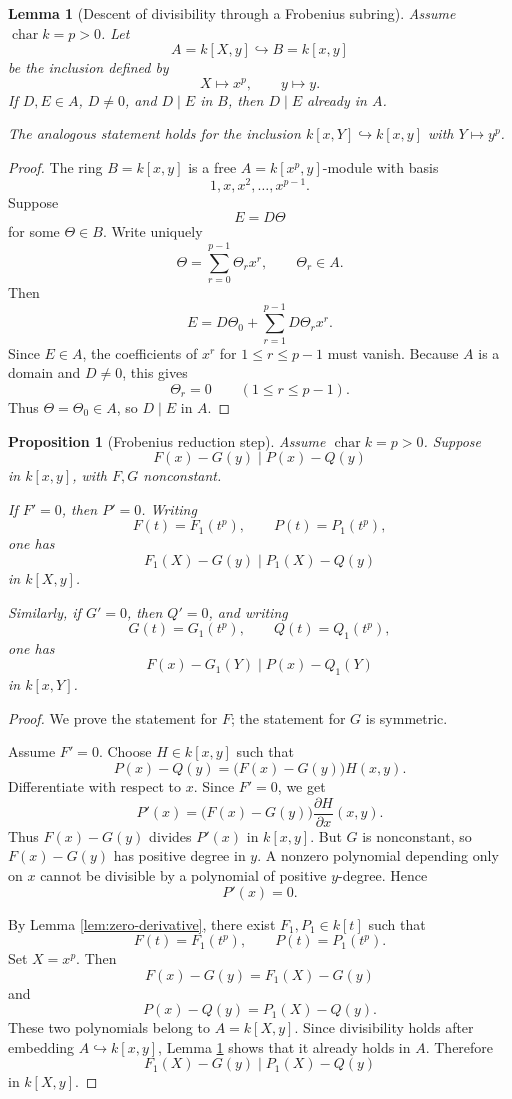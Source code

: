 \documentclass[12pt]{article}
\newtheorem{proposition}[theorem]{Proposition}
\newtheorem{lemma}[theorem]{Lemma}
\begin{document}
\begin{lemma}[Descent of divisibility through a Frobenius subring]\label{lem:frob-descent}
Assume \(\operatorname{char} k=p>0\).  Let
\[
    A=k[X,y]
    \hookrightarrow
    B=k[x,y]
\]
be the inclusion defined by
\[
    X\longmapsto x^p,
    \qquad
    y\longmapsto y.
\]
If \(D,E\in A\), \(D\neq 0\), and \(D\mid E\) in \(B\), then \(D\mid E\) already in \(A\).

The analogous statement holds for the inclusion \(k[x,Y]\hookrightarrow k[x,y]\) with \(Y\mapsto y^p\).
\end{lemma}

\begin{proof}
The ring \(B=k[x,y]\) is a free \(A=k[x^p,y]\)-module with basis
\[
    1,x,x^2,\ldots,x^{p-1}.
\]
Suppose
\[
    E=D\Theta
\]
for some \(\Theta\in B\).  Write uniquely
\[
    \Theta=\sum_{r=0}^{p-1}\Theta_r x^r,
    \qquad
    \Theta_r\in A.
\]
Then
\[
    E=D\Theta_0+\sum_{r=1}^{p-1}D\Theta_r x^r.
\]
Since \(E\in A\), the coefficients of \(x^r\) for \(1\leq r\leq p-1\) must vanish.  Because \(A\) is a domain and \(D\neq0\), this gives
\[
    \Theta_r=0
    \qquad
    (1\leq r\leq p-1).
\]
Thus \(\Theta=\Theta_0\in A\), so \(D\mid E\) in \(A\).
\end{proof}

\begin{proposition}[Frobenius reduction step]\label{prop:frob-step}
Assume \(\operatorname{char} k=p>0\).  Suppose
\[
    F(x)-G(y)\mid P(x)-Q(y)
\]
in \(k[x,y]\), with \(F,G\) nonconstant.

If \(F'=0\), then \(P'=0\).  Writing
\[
    F(t)=F_1(t^p),
    \qquad
    P(t)=P_1(t^p),
\]
one has
\[
    F_1(X)-G(y)
    \mid
    P_1(X)-Q(y)
\]
in \(k[X,y]\).

Similarly, if \(G'=0\), then \(Q'=0\), and writing
\[
    G(t)=G_1(t^p),
    \qquad
    Q(t)=Q_1(t^p),
\]
one has
\[
    F(x)-G_1(Y)
    \mid
    P(x)-Q_1(Y)
\]
in \(k[x,Y]\).
\end{proposition}

\begin{proof}
We prove the statement for \(F\); the statement for \(G\) is symmetric.

Assume \(F'=0\).  Choose \(H\in k[x,y]\) such that
\[
    P(x)-Q(y)=\bigl(F(x)-G(y)\bigr)H(x,y).
\]
Differentiate with respect to \(x\).  Since \(F'=0\), we get
\[
    P'(x)=\bigl(F(x)-G(y)\bigr)\frac{\partial H}{\partial x}(x,y).
\]
Thus \(F(x)-G(y)\) divides \(P'(x)\) in \(k[x,y]\).  But \(G\) is nonconstant, so \(F(x)-G(y)\) has positive degree in \(y\).  A nonzero polynomial depending only on \(x\) cannot be divisible by a polynomial of positive \(y\)-degree.  Hence
\[
    P'(x)=0.
\]

By Lemma \ref{lem:zero-derivative}, there exist \(F_1,P_1\in k[t]\) such that
\[
    F(t)=F_1(t^p),
    \qquad
    P(t)=P_1(t^p).
\]
Set \(X=x^p\).  Then
\[
    F(x)-G(y)=F_1(X)-G(y)
\]
and
\[
    P(x)-Q(y)=P_1(X)-Q(y).
\]
These two polynomials belong to \(A=k[X,y]\).  Since divisibility holds after embedding \(A\hookrightarrow k[x,y]\), Lemma \ref{lem:frob-descent} shows that it already holds in \(A\).  Therefore
\[
    F_1(X)-G(y)
    \mid
    P_1(X)-Q(y)
\]
in \(k[X,y]\).
\end{proof}
\end{document}
